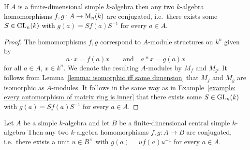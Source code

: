 \begin{corollary}
  \label{corollary: skolem noether for into matrix rings}
  If $A$ is a finite-dimensional simple $k$-algebra then any two $k$-algebra homomorphisms $f, g \colon A \to \operatorname{M}_n(k)$ are conjugated, i.e.\ there exists some $S \in \operatorname{GL}_n(k)$ with $g(a) = S f(a) S^{-1}$ for every $a \in A$.
\end{corollary}


\begin{proof}
  The homomorphisms $f, g$ correspond to $A$-module structures on $k^n$ given by
  \[
    a \cdot x = f(a)x
    \qquad\text{and}\quad
    a * x = g(a)x
  \]
  for all $a \in A$, $x \in k^n$.
  We denote the resulting $A$-modules by $M_f$ and $M_g$.
  It follows from Lemma~\ref{lemma: isomorphic iff same dimension} that $M_f$ and $M_g$ are isomorphic as $A$-modules.
  It follows in the same way as in Example~\ref{example: every automorphism of matrix ring is inner} that there exists some $S \in \operatorname{GL}_n(k)$ with $g(a) = S f(a) S^{-1}$ for every $a \in A$.
\end{proof}


\begin{theorem}
 Let $A$ be a simple $k$-algebra and let $B$ be a finite-dimensional central simple $k$-algebra
 Then any two $k$-algebra homomorphisms $f, g \colon A \to B$ are conjugated, i.e.\ there exists a unit $u \in B^\times$ with $g(a) = u f(a) u^{-1}$ for every $a \in A$.
\end{theorem}


